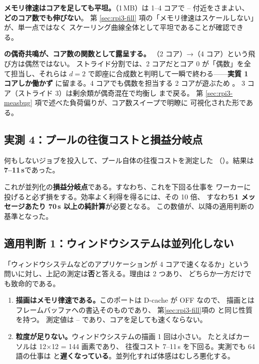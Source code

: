 \textbf{メモリ律速はコアを足しても平坦。}（1\,MB）は
1--4 コアで -- 付近をさまよい、\textbf{どのコア数でも伸びない}。
第 \ref{sec:rpi3-fill} 項の「メモリ律速はスケールしない」が、単一点ではなく
スケーリング曲線全体として平坦であることが確認できる。

\textbf{ の偶奇共鳴が、コア数の関数として露呈する。}
（2 コア）→（4 コア）という飛び方は偶然ではない。
ストライド分割では、2 コアだとコア 0 が「偶数」を全て担当し、それらは
$d=2$ で即座に合成数と判明して一瞬で終わる——\textbf{実質 1 コアしか働かず}
 に留まる。4 コアでも偶数を担当する 2 コアが遊ぶため 。
3 コア（ストライド 3）は剰余類が偶奇混在で均衡し  まで戻る。
第 \ref{sec:rpi3-measbug} 項で述べた負荷偏りが、コア数スイープで明瞭に
可視化された形である。

\subsection{実測 4：プールの往復コストと損益分岐点}

何もしないジョブを投入して、プール自体の往復コストを測定した
（）。結果は\textbf{7--11\,\textmu s}であった。

これが並列化の\textbf{損益分岐点}である。すなわち、これを下回る仕事を
ワーカーに投げると必ず損をする。効率よく利得を得るには、その 10 倍、
すなわち\textbf{1 メッセージあたり 70\,\textmu s 以上の純計算}が必要となる。
この数値が、以降の適用判断の基準となった。

\subsection{適用判断 1：ウィンドウシステムは並列化しない}

「ウィンドウシステムなどのアプリケーションが 4 コアで速くなるか」という
問いに対し、上記の測定は\textbf{否}と答える。理由は 2 つあり、
どちらか一方だけでも致命的である。

\begin{enumerate}[leftmargin=1.6em]
  \item \textbf{描画はメモリ律速である。}このポートは D-cache が OFF なので、
        描画とはフレームバッファへの書込そのものであり、
        第\ref{sec:rpi3-fill}項の  と同じ性質を持つ。
        測定値は -- であり、コアを足しても速くならない。
  \item \textbf{粒度が足りない。}ウィンドウシステムの描画 1 回は小さい。
        たとえばカーソルは 12$\times$12 = 144 画素であり、
        往復コスト 7--11\,\textmu s を下回る。実測でも 64 語の仕事は
         と\textbf{遅くなっている}。並列化すれば体感はむしろ悪化する。
\end{enumerate}

